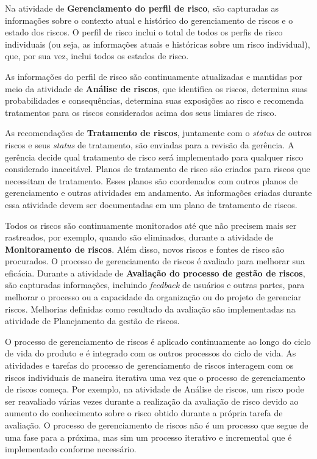 \documentclass[
	12pt,
	openright,
	twoside,
	a4paper,
	english,
	brazil
	]{abntex2}
\begin{document}
Na atividade de \textbf{Gerenciamento do perfil de risco}, são capturadas as informações sobre o contexto atual e histórico do gerenciamento de riscos e o estado dos riscos. O perfil de risco inclui o total de todos os perfis de risco individuais (ou seja, as informações atuais e históricas sobre um risco individual), que, por sua vez, inclui todos os estados de risco.

As informações do perfil de risco são continuamente atualizadas e mantidas por meio da atividade de \textbf{Análise de riscos}, que identifica os riscos, determina suas probabilidades e consequências, determina suas exposições ao risco e recomenda tratamentos para os riscos considerados acima dos seus limiares de risco. 

As recomendações de \textbf{Tratamento de riscos}, juntamente com o \textit{status} de outros riscos e seus \textit{status} de tratamento, são enviadas para a revisão da gerência. A gerência decide qual tratamento de risco será implementado para qualquer risco considerado inaceitável. Planos de tratamento de risco são criados para riscos que necessitam de tratamento. Esses planos são coordenados com outros planos de gerenciamento e outras atividades em andamento. As informações criadas durante essa atividade devem ser documentadas em um plano de tratamento de riscos.

Todos os riscos são continuamente monitorados até que não precisem mais ser rastreados, por exemplo, quando são eliminados, durante a atividade de \textbf{Monitoramento de riscos}. Além disso, novos riscos e fontes de risco são procurados. O processo de gerenciamento de riscos é avaliado para melhorar sua eficácia. Durante a atividade de \textbf{Avaliação do processo de gestão de riscos}, são capturadas informações, incluindo \textit{feedback} de usuários e outras partes, para melhorar o processo ou a capacidade da organização ou do projeto de gerenciar riscos. Melhorias definidas como resultado da avaliação são implementadas na atividade de Planejamento da gestão de riscos.

O processo de gerenciamento de riscos é aplicado continuamente ao longo do ciclo de vida do produto e é integrado com os outros processos do ciclo de vida. As atividades e tarefas do processo de gerenciamento de riscos interagem com os riscos individuais de maneira iterativa uma vez que o processo de gerenciamento de riscos começa. Por exemplo, na atividade de Análise de riscos, um risco pode ser reavaliado várias vezes durante a realização da avaliação de risco devido ao aumento do conhecimento sobre o risco obtido durante a própria tarefa de avaliação. O processo de gerenciamento de riscos não é um processo que segue de uma fase para a próxima, mas sim um processo iterativo e incremental que é implementado conforme necessário.
\end{document}
